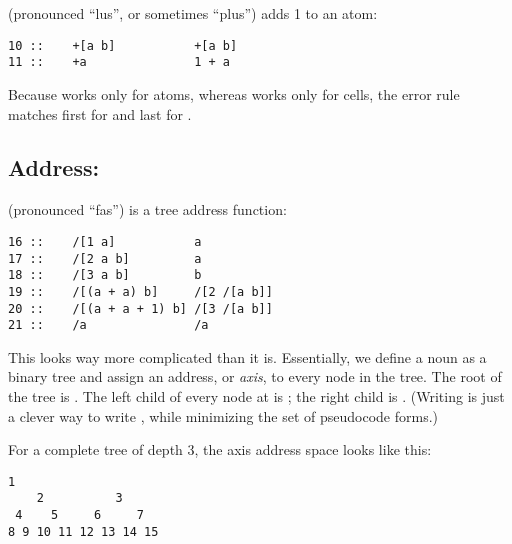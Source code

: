 \kode{+} (pronounced ``lus'', or sometimes ``plus'') adds 1 to an atom:

\begin{framed_shaded}
\begin{Verbatim}[fontsize=\relsize{-2.5},fontseries=b,commandchars=\\\{\}]
10 ::    +[a b]           +[a b]
11 ::    +a               1 + a
\end{Verbatim}
\end{framed_shaded}

Because \kode{+} works only for atoms, whereas \kode{=} works only for
cells, the error rule matches first for \kode{+} and last for \kode{=}.

\subsection{Address: \kode{/}}

\kode{/} (pronounced ``fas'') is a tree address function:

\begin{framed_shaded}
\begin{Verbatim}[fontsize=\relsize{-2.5},fontseries=b,commandchars=\\\{\}]
16 ::    /[1 a]           a
17 ::    /[2 a b]         a
18 ::    /[3 a b]         b
19 ::    /[(a + a) b]     /[2 /[a b]]
20 ::    /[(a + a + 1) b] /[3 /[a b]]
21 ::    /a               /a
\end{Verbatim}
\end{framed_shaded}

This looks way more complicated than it is.  Essentially, we
define a noun as a binary tree and assign an address, or \emph{axis},
to every node in the tree.  The root of the tree is .  The
left child of every node at  is ; the right child is
.  (Writing  is just a clever way to write ,
while minimizing the set of pseudocode forms.)

For a complete tree of depth 3, the axis address space looks
like this:

\begin{framed_shaded}
\begin{Verbatim}[fontsize=\relsize{-2.5},fontseries=b,commandchars=\\\{\}]
         1
    2          3
 4    5     6     7
8 9 10 11 12 13 14 15
\end{Verbatim}
\end{framed_shaded}

